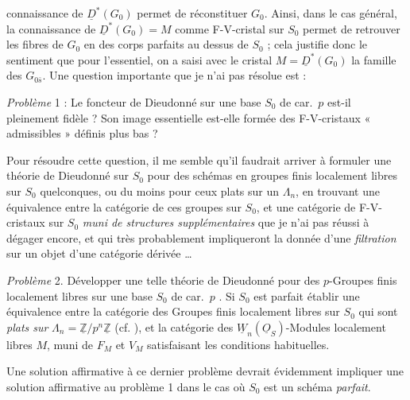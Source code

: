 \documentclass[11pt,a4paper]{article}
\begin{document}
connaissance de $\underline{D}^{*}(G_{0})$ permet de réconstituer $G_{0}$. Ainsi, dans le cas général, la connaissance de $\underline{D}^{*}(G_{0}) = M$ comme F-V-cristal sur $S_{0}$ permet de retrouver les fibres de $G_{0}$ en des corps parfaits au dessus de $S_{0}$ ; cela justifie donc le sentiment que pour l'essentiel, on a saisi avec le cristal $M = \underline{D}^{*}(G_{0})$ la famille des $G_{0\bar{s}}$. Une question importante  que je n'ai pas résolue est :

\emph{Problème} 1 : Le foncteur de Dieudonné sur une base $S_{0}$ de car.~$p$ est-il pleinement fidèle ?  Son image essentielle est-elle formée des F-V-cristaux « admissibles » définis plus bas ?

Pour résoudre cette question, il me semble qu'il faudrait arriver à formuler une théorie de Dieudonné sur  $S_{0}$ pour des schémas en groupes finis localement libres sur $S_{0}$ quelconques, ou du moins pour ceux plats sur un $\Lambda_{n}$, en trouvant une équivalence entre  la catégorie de ces groupes sur $S_{0}$, et une catégorie de F-V-cristaux sur $S_{0}$ \emph{muni de structures supplémentaires} que je n'ai pas réussi à dégager encore, et qui très probablement impliqueront la donnée d'une \emph{filtration} sur un objet  d'une catégorie dérivée …


\emph{Problème} 2. Développer une telle théorie de Dieudonné pour des $p$-Groupes finis localement libres sur une base $S_{0}$ de car.~$p$ . Si $S_{0}$ est parfait établir une équivalence entre la catégorie des Groupes finis localement libres sur $S_{0}$ qui sont \emph{plats sur} $\Lambda_{n} = \underline{\mathbb{Z}}/p^{n}\underline{\mathbb{Z}}$ (cf. \quad), et la catégorie des $\underline{W}_{n}(\underline{O}_{S})$-Modules localement libres $M$, muni de $F_{M}$ et $V_{M}$ \struck{\ill{}} satisfaisant les conditions habituelles.

Une solution affirmative à ce dernier problème devrait évidemment impliquer une solution affirmative au problème 1 dans le cas où $S_{0}$ est un schéma \emph{parfait}.
\end{document}
